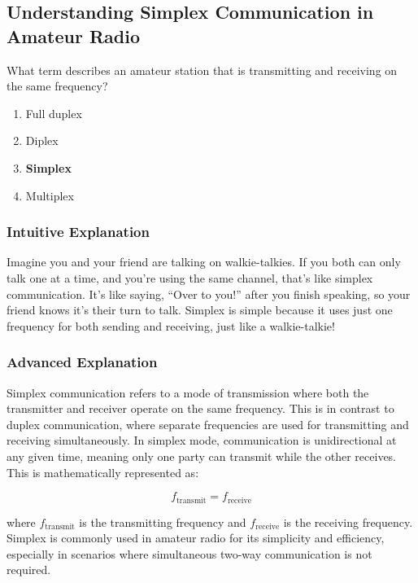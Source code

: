 \subsection{Understanding Simplex Communication in Amateur Radio}
\label{T2A11}

\begin{tcolorbox}[colback=gray!10!white,colframe=black!75!black,title=T2A11]
What term describes an amateur station that is transmitting and receiving on the same frequency?
\begin{enumerate}[label=\Alph*)]
    \item Full duplex
    \item Diplex
    \item \textbf{Simplex}
    \item Multiplex
\end{enumerate}
\end{tcolorbox}

\subsubsection{Intuitive Explanation}
Imagine you and your friend are talking on walkie-talkies. If you both can only talk one at a time, and you’re using the same channel, that’s like simplex communication. It’s like saying, “Over to you!” after you finish speaking, so your friend knows it’s their turn to talk. Simplex is simple because it uses just one frequency for both sending and receiving, just like a walkie-talkie!

\subsubsection{Advanced Explanation}
Simplex communication refers to a mode of transmission where both the transmitter and receiver operate on the same frequency. This is in contrast to duplex communication, where separate frequencies are used for transmitting and receiving simultaneously. In simplex mode, communication is unidirectional at any given time, meaning only one party can transmit while the other receives. This is mathematically represented as:

\[
f_{\text{transmit}} = f_{\text{receive}}
\]

where \( f_{\text{transmit}} \) is the transmitting frequency and \( f_{\text{receive}} \) is the receiving frequency. Simplex is commonly used in amateur radio for its simplicity and efficiency, especially in scenarios where simultaneous two-way communication is not required.

